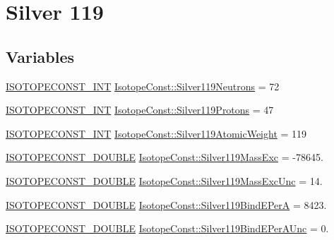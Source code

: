 \hypertarget{group___isotope_const-_silver-_ag119}{}\section{Silver 119}
\label{group___isotope_const-_silver-_ag119}
\subsection*{Variables}
\begin{DoxyCompactItemize}
\item 
\mbox{\hyperlink{group___isotope_const-_macros_ga5f18360b3e99483a35c32d789e62621c}{I\+S\+O\+T\+O\+P\+E\+C\+O\+N\+S\+T\+\_\+\+I\+NT}} \mbox{\hyperlink{group___isotope_const-_silver-_ag119_gad013187d2e89ad47afd5fdfd9871ae27}{Isotope\+Const\+::\+Silver119\+Neutrons}} = 72
\item 
\mbox{\hyperlink{group___isotope_const-_macros_ga5f18360b3e99483a35c32d789e62621c}{I\+S\+O\+T\+O\+P\+E\+C\+O\+N\+S\+T\+\_\+\+I\+NT}} \mbox{\hyperlink{group___isotope_const-_silver-_ag119_ga009f6a40aed2d0585e9894813826cd05}{Isotope\+Const\+::\+Silver119\+Protons}} = 47
\item 
\mbox{\hyperlink{group___isotope_const-_macros_ga5f18360b3e99483a35c32d789e62621c}{I\+S\+O\+T\+O\+P\+E\+C\+O\+N\+S\+T\+\_\+\+I\+NT}} \mbox{\hyperlink{group___isotope_const-_silver-_ag119_gaa0611a09c3b16231bf030c09c1794661}{Isotope\+Const\+::\+Silver119\+Atomic\+Weight}} = 119
\item 
\mbox{\hyperlink{group___isotope_const-_macros_ga8f45a7272ce02c0b4c65c44636ed719a}{I\+S\+O\+T\+O\+P\+E\+C\+O\+N\+S\+T\+\_\+\+D\+O\+U\+B\+LE}} \mbox{\hyperlink{group___isotope_const-_silver-_ag119_ga3568193639521feebc60759800afce7d}{Isotope\+Const\+::\+Silver119\+Mass\+Exc}} = -\/78645.
\item 
\mbox{\hyperlink{group___isotope_const-_macros_ga8f45a7272ce02c0b4c65c44636ed719a}{I\+S\+O\+T\+O\+P\+E\+C\+O\+N\+S\+T\+\_\+\+D\+O\+U\+B\+LE}} \mbox{\hyperlink{group___isotope_const-_silver-_ag119_gadf15994fc342f9b0fae238a020dd5af4}{Isotope\+Const\+::\+Silver119\+Mass\+Exc\+Unc}} = 14.
\item 
\mbox{\hyperlink{group___isotope_const-_macros_ga8f45a7272ce02c0b4c65c44636ed719a}{I\+S\+O\+T\+O\+P\+E\+C\+O\+N\+S\+T\+\_\+\+D\+O\+U\+B\+LE}} \mbox{\hyperlink{group___isotope_const-_silver-_ag119_ga704dcc3957763736c3de549693d3021f}{Isotope\+Const\+::\+Silver119\+Bind\+E\+PerA}} = 8423.
\item 
\mbox{\hyperlink{group___isotope_const-_macros_ga8f45a7272ce02c0b4c65c44636ed719a}{I\+S\+O\+T\+O\+P\+E\+C\+O\+N\+S\+T\+\_\+\+D\+O\+U\+B\+LE}} \mbox{\hyperlink{group___isotope_const-_silver-_ag119_ga3178c50905dec18576e2ad39c1b55a48}{Isotope\+Const\+::\+Silver119\+Bind\+E\+Per\+A\+Unc}} = 0.

\end{DoxyCompactItemize}
